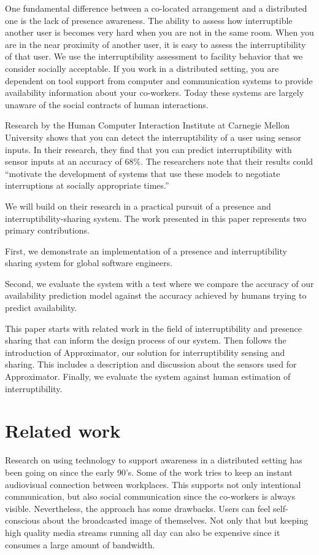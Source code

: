 \documentclass{sigchi}
\begin{document}
One fundamental difference between a co-located arrangement and a distributed one is the lack of presence awareness.
The ability to assess how interruptible another user is becomes very hard when you are not in the same room.
When you are in the near proximity of another user, it is easy to assess the interruptibility of that user.
We use the interruptibility assessment to facility behavior that we consider socially acceptable.
If you work in a distributed setting, you are dependent on tool support from computer and communication systems to provide availability information about your co-workers.
Today these systems are largely unaware of the social contracts of human interactions.

Research by the Human Computer Interaction Institute at Carnegie Mellon University \cite{fogarty2005predicting} shows that you can detect the interruptibility of a user using sensor inputs.
In their research, they find that you can predict interruptibility with sensor inputs at an accuracy of 68\%.
The researchers note that their results could ``motivate the development of systems that use these models to negotiate interruptions at socially appropriate times.''

We will build on their research in a practical pursuit of a presence and interruptibility-sharing system.
The work presented in this paper represents two primary contributions.

First, we demonstrate an implementation of a presence and interruptibility sharing system for global software engineers.

Second, we evaluate the system with a test where we compare the accuracy of our availability prediction model against the accuracy achieved by humans trying to predict availability.

This paper starts with related work in the field of interruptibility and presence sharing that can inform the design process of our system.
Then follows the introduction of Approximator, our solution for interruptibility sensing and sharing.
This includes a description and discussion about the sensors used for Approximator.
Finally, we evaluate the system against human estimation of interruptibility.

\section{Related work}
Research on using technology to support awareness in a distributed setting has been going on since the early 90's.
Some of the work \cite{bly1993media} \cite{gaver1992realizing} \cite{mantei1991experiences} tries to keep an instant audiovisual connection between workplaces.
This supports not only intentional communication, but also social communication since the co-workers is always visible.
Nevertheless, the approach has some drawbacks.
Users can feel self-conscious about the broadcasted image of themselves.
Not only that but keeping high quality media streams running all day can also be expensive since it consumes a large amount of bandwidth.
\end{document}
